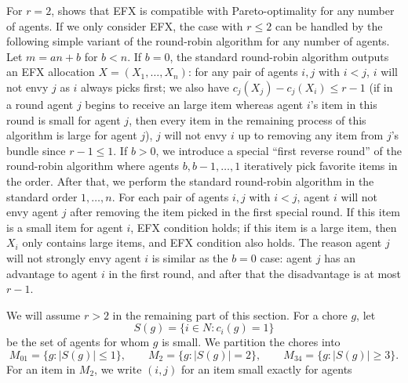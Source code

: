 \documentclass[10pt]{article}
\begin{document}
\begin{ReviewVerbatim}
For $r=2$, \citet{lin2025approximately} shows that EFX is compatible with Pareto-optimality for any number of agents.
If we only consider EFX, the case with $r\leq 2$ can be handled by the following simple variant of the round-robin algorithm for any number of agents.
Let $m=an+b$ for $b<n$.
If $b=0$, the standard round-robin algorithm outputs an EFX allocation $X=(X_1,\ldots,X_n)$: for any pair of agents $i,j$ with $i<j$, $i$ will not envy $j$ as $i$ always picks first; we also have $c_j(X_j)-c_j(X_i)\leq r-1$ (if in a round agent $j$ begins to receive an large item whereas agent $i$'s item in this round is small for agent $j$, then every item in the remaining process of this algorithm is large for agent $j$), $j$ will not envy $i$ up to removing any item from $j$'s bundle since $r-1\leq1$.
If $b>0$, we introduce a special ``first reverse round'' of the round-robin algorithm where agents $b,b-1,\ldots,1$ iteratively pick favorite items in the order.
After that, we perform the standard round-robin algorithm in the standard order $1,\ldots,n$.
For each pair of agents $i,j$ with $i<j$, agent $i$ will not envy agent $j$ after removing the item picked in the first special round. If this item is a small item for agent $i$, EFX condition holds; if this item is a large item, then $X_i$ only contains large items, and EFX condition also holds.
The reason agent $j$ will not strongly envy agent $i$ is similar as the $b=0$ case: agent $j$ has an advantage to agent $i$ in the first round, and after that the disadvantage is at most $r-1$.

We will assume $r>2$ in the remaining part of this section.
For a chore $g$, let
\[
 S(g)=\{i\in N:c_i(g)=1\}
\]
be the set of agents for whom $g$ is small.  We partition the chores into
\[
M_{01}=\{g:|S(g)|\le 1\},\qquad
M_2=\{g:|S(g)|=2\},\qquad
M_{34}=\{g:|S(g)|\ge 3\}.
\]
For an item in $M_2$, we write $(i,j)$ for an item small exactly for agents
\end{ReviewVerbatim}
\end{document}
